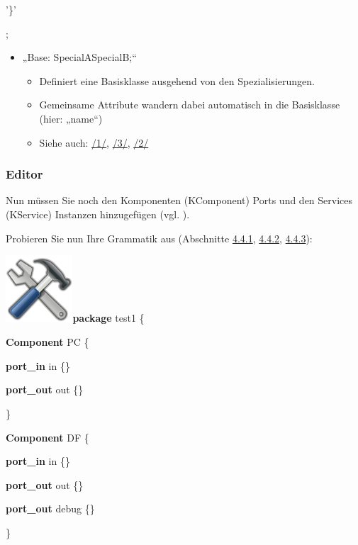 \documentclass[]{article}
\providecommand{\tightlist}{%
  \setlength{\itemsep}{0pt}\setlength{\parskip}{0pt}}
\begin{document}
'\}'

;

\begin{itemize}
\item
  „Base: SpecialA\textbar{}SpecialB;``

  \begin{itemize}
  \tightlist
  \item
    Definiert eine Basisklasse ausgehend von den Spezialisierungen.
  \item
    Gemeinsame Attribute wandern dabei automatisch in die Basisklasse
    (hier: „name``)
  \item
    Siehe auch: \protect\hyperlink{anchor-1}{/1/},
    \protect\hyperlink{anchor-3}{/3/}, \protect\hyperlink{anchor-2}{/2/}
  \end{itemize}
\end{itemize}

\subsubsection[Editor]{\texorpdfstring{\protect\hypertarget{anchor-26}{}{}Editor}{Editor}}\label{editor}

Nun müssen Sie noch den Komponenten (KComponent) Ports und den Services
(KService) Instanzen hinzugefügen (vgl. ).

Probieren Sie nun Ihre Grammatik aus (Abschnitte
\protect\hyperlink{anchor-24}{4.4.1},
\protect\hyperlink{anchor-25}{4.4.2},
\protect\hyperlink{anchor-26}{4.4.3}):

\includegraphics[width=0.98350in,height=0.98350in]{./Pictures/1000020100000080000000807EA91CDFA7B7F397.png}\textbf{package}
test1 \{

\textbf{Component} PC \{

\textbf{port\_in} in \{\}

\textbf{port\_out} out \{\}

\}

\textbf{Component} DF \{

\textbf{port\_in} in \{\}

\textbf{port\_out} out \{\}

\textbf{port\_out} debug \{\}

\}
\end{document}
